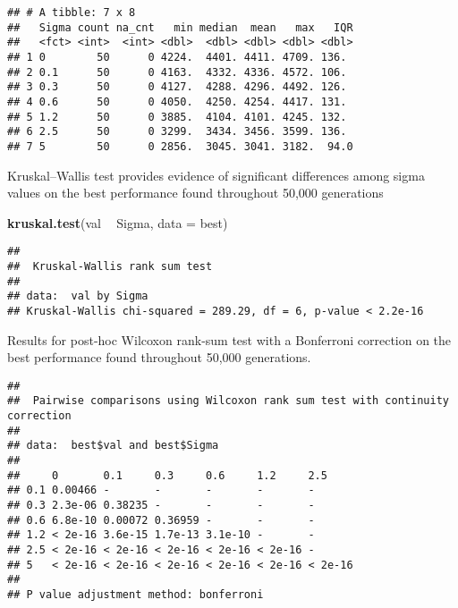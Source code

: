 \documentclass[]{book}
\newenvironment{Shaded}{\begin{snugshade}}{\end{snugshade}}
\newcommand{\DataTypeTok}[1]{\textcolor[rgb]{0.13,0.29,0.53}{#1}}
\newcommand{\KeywordTok}[1]{\textcolor[rgb]{0.13,0.29,0.53}{\textbf{#1}}}
\newcommand{\NormalTok}[1]{#1}
\newcommand{\OperatorTok}[1]{\textcolor[rgb]{0.81,0.36,0.00}{\textbf{#1}}}
\newcommand{\OtherTok}[1]{\textcolor[rgb]{0.56,0.35,0.01}{#1}}
\newcommand{\StringTok}[1]{\textcolor[rgb]{0.31,0.60,0.02}{#1}}
\begin{document}
\begin{verbatim}
## # A tibble: 7 x 8
##   Sigma count na_cnt   min median  mean   max   IQR
##   <fct> <int>  <int> <dbl>  <dbl> <dbl> <dbl> <dbl>
## 1 0        50      0 4224.  4401. 4411. 4709. 136. 
## 2 0.1      50      0 4163.  4332. 4336. 4572. 106. 
## 3 0.3      50      0 4127.  4288. 4296. 4492. 126. 
## 4 0.6      50      0 4050.  4250. 4254. 4417. 131. 
## 5 1.2      50      0 3885.  4104. 4101. 4245. 132. 
## 6 2.5      50      0 3299.  3434. 3456. 3599. 136. 
## 7 5        50      0 2856.  3045. 3041. 3182.  94.0
\end{verbatim}

Kruskal--Wallis test provides evidence of significant differences among sigma values on the best performance found throughout 50,000 generations

\begin{Shaded}
\begin{Highlighting}[]
\KeywordTok{kruskal.test}\NormalTok{(val }\OperatorTok{~}\StringTok{ }\NormalTok{Sigma, }\DataTypeTok{data =}\NormalTok{ best)}
\end{Highlighting}
\end{Shaded}

\begin{verbatim}
## 
##  Kruskal-Wallis rank sum test
## 
## data:  val by Sigma
## Kruskal-Wallis chi-squared = 289.29, df = 6, p-value < 2.2e-16
\end{verbatim}

Results for post-hoc Wilcoxon rank-sum test with a Bonferroni correction on the best performance found throughout 50,000 generations.

\begin{Shaded}
\end{Shaded}

\begin{verbatim}
## 
##  Pairwise comparisons using Wilcoxon rank sum test with continuity correction 
## 
## data:  best$val and best$Sigma 
## 
##     0       0.1     0.3     0.6     1.2     2.5    
## 0.1 0.00466 -       -       -       -       -      
## 0.3 2.3e-06 0.38235 -       -       -       -      
## 0.6 6.8e-10 0.00072 0.36959 -       -       -      
## 1.2 < 2e-16 3.6e-15 1.7e-13 3.1e-10 -       -      
## 2.5 < 2e-16 < 2e-16 < 2e-16 < 2e-16 < 2e-16 -      
## 5   < 2e-16 < 2e-16 < 2e-16 < 2e-16 < 2e-16 < 2e-16
## 
## P value adjustment method: bonferroni
\end{verbatim}
\end{document}
